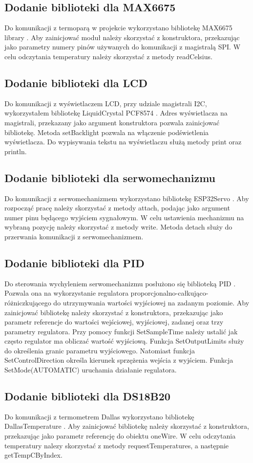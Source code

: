 \documentclass[11pt]{report}
\begin{document}
 \subsection{Dodanie biblioteki dla MAX6675}
 Do komunikacji z termoparą w projekcie wykorzystano bibliotekę MAX6675 library \cite{MAX6675library}. Aby zainicjować moduł należy skorzystać z konstruktora, przekazując jako parametry numery pinów używanych do komunikacji z magistralą SPI.
 W celu odczytania temperatury należy skorzystać z metody readCelsius.
 \subsection{Dodanie biblioteki dla LCD}
 Do komunikacji z wyświetlaczem LCD, przy udziale magistrali I2C, wykorzystałem bibliotekę LiquidCrystal PCF8574 \cite{LCDlibrary}. Adres wyświetlacza na magistrali, przekazany jako argument konstruktora pozwala zainicjować bibliotekę. Metoda setBacklight pozwala na włączenie podświetlenia wyświetlacza. Do wypisywania tekstu na wyświetlaczu służą metody print oraz println.
 \subsection{Dodanie biblioteki dla serwomechanizmu}
 Do komunikacji z serwomechanizmem wykorzystano bibliotekę ESP32Servo \cite{Servolibrary}. Aby rozpocząć pracę należy skorzystać z metody attach, podając jako argument numer pinu będącego wyjściem sygnałowym. W celu ustawienia mechanizmu na wybraną pozycję należy skorzystać z metody write. Metoda detach służy do przerwania komunikacji z serwomechanizmem.
 \subsection{Dodanie biblioteki dla PID}
 Do sterowania wychyleniem serwomechanizmu posłużono się biblioteką PID \cite{PIDlibrary}. Pozwala ona na wykorzystanie regulatora proporcjonalno-całkująco-różniczkującego do utrzymywania wartości wyjściowej na zadanym poziomie.
 Aby zainicjować bibliotekę  należy skorzystać z konstruktora, przekazując jako parametr referencje do wartości wejściowej, wyjściowej, zadanej oraz trzy parametry regulatora. Przy pomocy funkcji SetSampleTime należy ustalić jak często regulator ma obliczać wartość wyjściową. Funkcja SetOutputLimits służy do określenia granic parametru wyjściowego. Natomiast funkcja SetControlDirection określa kierunek sprzężenia wejścia z wyjściem. Funkcja SetMode(AUTOMATIC) uruchamia działanie regulatora.
 \subsection{Dodanie biblioteki dla DS18B20}
 Do komunikacji z termometrem Dallas wykorzystano bibliotekę DallasTemperature \cite{dallaslibrary}. Aby zainicjować bibliotekę należy skorzystać z konstruktora, przekazując jako parametr referencję do obiektu oneWire. W celu odczytania temperatury nalezy skorzystać z metody requestTemperatures, a następnie getTempCByIndex.
\end{document}
